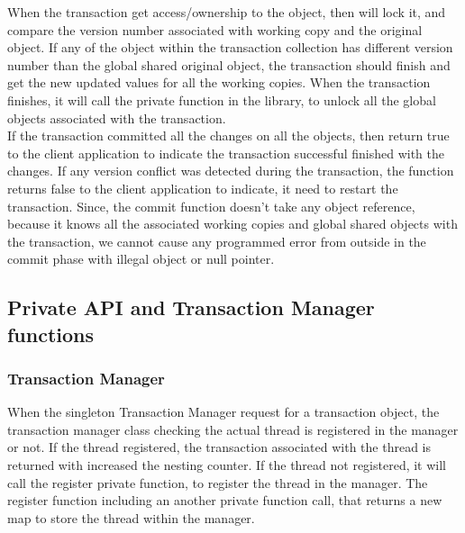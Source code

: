 \documentclass[12pt]{article}
\begin{document}
When the transaction get access/ownership to the object, then will lock it, and compare the version number associated with working copy and the original object. If any of the object within the transaction collection has different version number than the global shared original object, the transaction should finish and get the new updated values for all the working copies. When the transaction finishes, it will call the private function in the library, to unlock all the global objects associated with the transaction.\\

If the transaction committed all the changes on all the objects, then return true to the client application to indicate the transaction successful finished with the changes. If any version conflict was detected during the transaction, the function  returns false to the client application to indicate, it need to restart the transaction. Since, the commit function doesn't take any object reference, because it knows all the associated working copies and global shared objects with the transaction, we cannot cause any programmed error from outside in the commit phase with illegal object or null pointer.

\subsection{Private API and Transaction Manager functions}
\subsubsection{Transaction Manager}
When the singleton Transaction Manager request for a transaction object, the transaction manager class checking the actual thread is registered in the manager or not. If the thread registered, the transaction associated with the thread is returned with increased the nesting counter. If the thread not registered, it will call the register private function, to register the thread in the manager. The register function including an another private function call, that returns a new map to store the thread within the manager.
\end{document}
